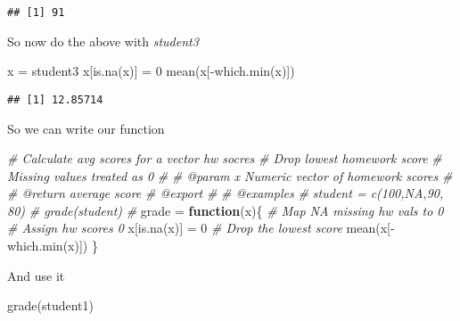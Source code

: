\documentclass[
]{article}
\newenvironment{Shaded}{\begin{snugshade}}{\end{snugshade}}
\newcommand{\CommentTok}[1]{\textcolor[rgb]{0.56,0.35,0.01}{\textit{#1}}}
\newcommand{\ControlFlowTok}[1]{\textcolor[rgb]{0.13,0.29,0.53}{\textbf{#1}}}
\newcommand{\DecValTok}[1]{\textcolor[rgb]{0.00,0.00,0.81}{#1}}
\newcommand{\FunctionTok}[1]{\textcolor[rgb]{0.00,0.00,0.00}{#1}}
\newcommand{\NormalTok}[1]{#1}
\newcommand{\OtherTok}[1]{\textcolor[rgb]{0.56,0.35,0.01}{#1}}
\newcommand{\SpecialCharTok}[1]{\textcolor[rgb]{0.00,0.00,0.00}{#1}}
\begin{document}
\begin{verbatim}
## [1] 91
\end{verbatim}

So now do the above with \emph{student3}

\begin{Shaded}
\begin{Highlighting}[]
\NormalTok{x }\OtherTok{=}\NormalTok{ student3}
\NormalTok{x[}\FunctionTok{is.na}\NormalTok{(x)] }\OtherTok{=} \DecValTok{0}
\FunctionTok{mean}\NormalTok{(x[}\SpecialCharTok{{-}}\FunctionTok{which.min}\NormalTok{(x)])}
\end{Highlighting}
\end{Shaded}

\begin{verbatim}
## [1] 12.85714
\end{verbatim}

So we can write our function

\begin{Shaded}
\begin{Highlighting}[]
\CommentTok{\#\textquotesingle{} Calculate avg scores for a vector hw socres}
\CommentTok{\#\textquotesingle{} Drop lowest homework score}
\CommentTok{\#\textquotesingle{} Missing values treated as 0}
\CommentTok{\#\textquotesingle{}}
\CommentTok{\#\textquotesingle{} @param x Numeric vector of homework scores}
\CommentTok{\#\textquotesingle{}}
\CommentTok{\#\textquotesingle{} @return average score}
\CommentTok{\#\textquotesingle{} @export}
\CommentTok{\#\textquotesingle{}}
\CommentTok{\#\textquotesingle{} @examples}
\CommentTok{\#\textquotesingle{} student = c(100,NA,90, 80)}
\CommentTok{\#\textquotesingle{} grade(student)}
\CommentTok{\#\textquotesingle{} }
\NormalTok{grade }\OtherTok{=} \ControlFlowTok{function}\NormalTok{(x)\{}
  \CommentTok{\# Map NA missing hw vals to 0}
  \CommentTok{\# Assign hw scores 0}
\NormalTok{  x[}\FunctionTok{is.na}\NormalTok{(x)] }\OtherTok{=} \DecValTok{0}
  \CommentTok{\# Drop the lowest score}
  \FunctionTok{mean}\NormalTok{(x[}\SpecialCharTok{{-}}\FunctionTok{which.min}\NormalTok{(x)])}
\NormalTok{\}}
\end{Highlighting}
\end{Shaded}

And use it

\begin{Shaded}
\begin{Highlighting}[]
\FunctionTok{grade}\NormalTok{(student1)}
\end{Highlighting}
\end{Shaded}
\end{document}
